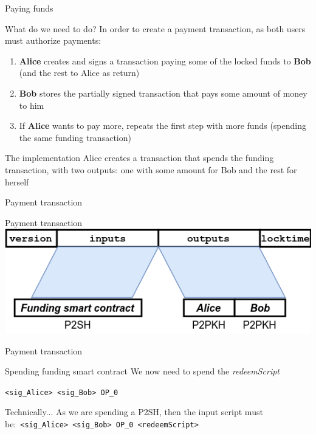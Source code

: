 \documentclass{beamer}
\begin{document}
\begin{frame}{Paying funds}
 \begin{block}{What do we need to do?}
  In order to create a payment transaction, as both users must authorize payments:
  \begin{enumerate}
   \item \textbf{Alice} creates and signs a transaction paying some of the locked funds to \textbf{Bob} (and the rest to Alice as return)
   \item \textbf{Bob} stores the partially signed transaction that pays some amount of money to him
   \item If \textbf{Alice} wants to pay more, repeats the first step with more funds (spending the same funding transaction)
  \end{enumerate}
 \end{block}
 \pause
 \begin{block}{The implementation}
  Alice creates a transaction that spends the funding transaction, with two outputs: one with some amount for Bob and the rest for herself
 \end{block}
\end{frame}
\begin{frame}{Payment transaction}
 \begin{exampleblock}{Payment transaction}
  \includegraphics[width=\textwidth, height=0.8\textheight, keepaspectratio]{img/unidir_tx_payment.png}
 \end{exampleblock}
\end{frame}
\begin{frame}{Payment transaction}
 \begin{exampleblock}{Spending funding smart contract}
  We now need to spend the \textit{redeemScript}
  \pause
  \begin{center}
   \texttt{<sig\_Alice> <sig\_Bob> OP\_0}
  \end{center}
 \end{exampleblock}
 \begin{exampleblock}{Technically...}
  As we are spending a P2SH, then the input script must be:\
  \texttt{<sig\_Alice> <sig\_Bob> OP\_0 <redeemScript>}
 \end{exampleblock}
\end{frame}
\end{document}
